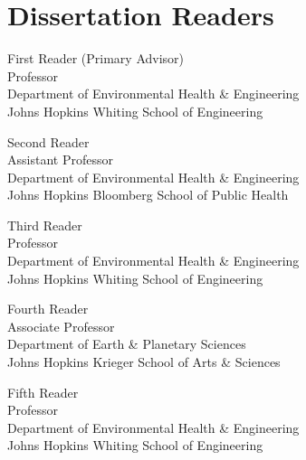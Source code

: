\chapter*{Dissertation Readers}

\begin{singlespace}

\noindent First Reader (Primary Advisor)\\
\indent Professor\\
\indent Department of Environmental Health \& Engineering\\
\indent Johns Hopkins Whiting School of Engineering\\
\medskip

\noindent Second Reader\\
\indent Assistant Professor\\
\indent Department of Environmental Health \& Engineering\\
\indent Johns Hopkins Bloomberg School of Public Health\\
\medskip

\noindent Third Reader\\
\indent Professor \\
\indent Department of Environmental Health \& Engineering\\
\indent Johns Hopkins Whiting School of Engineering\\
\medskip

\noindent Fourth Reader\\
\indent Associate Professor\\
\indent Department of Earth \& Planetary Sciences\\
\indent Johns Hopkins Krieger School of Arts \& Sciences\\
\medskip

\noindent Fifth Reader\\
\indent Professor\\
\indent Department of Environmental Health \& Engineering\\
\indent Johns Hopkins Whiting School of Engineering\\
\medskip 

\end{singlespace}

\newpage 
